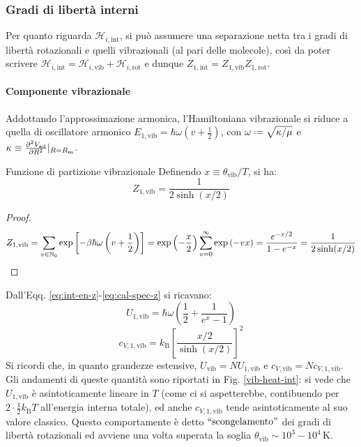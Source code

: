\subsubsection{Gradi di libertà interni}

Per quanto riguarda $ \mathcal{H}_{i,\text{int}} $, si può assumere una separazione netta tra i gradi di libertà rotazionali e quelli vibrazionali (al pari delle molecole), così da poter scrivere $ \mathcal{H}_{i,\text{int}} = \mathcal{H}_{i,\text{vib}} + \mathcal{H}_{i,\text{rot}} $ e dunque $ Z_{1,\text{int}} = Z_{1,\text{vib}} Z_{1,\text{rot}} $.

\paragraph{Componente vibrazionale}

Addottando l'approssimazione armonica, l'Hamiltoniana vibrazionale si riduce a quella di oscillatore armonico $ E_{1,\text{vib}} = \hbar \omega \left( v + \frac{1}{2} \right) $, con $ \omega \defeq\sqrt{\kappa / \mu} $ e $ \kappa \equiv \frac{\partial^2 V_\text{ad}}{\partial R^2}\vert_{R = R_\text{m}} $.

\begin{proposition}{Funzione di partizione vibrazionale}{}
	Definendo $ x \equiv \theta_\text{vib} / T $, si ha:
	\begin{equation}
		Z_{1,\text{vib}} = \frac{1}{2 \sinh(x/2)}
	\end{equation}

	\tcblower

	\begin{proof}
		\begin{equation*}
			Z_{1,\text{vib}} = \sum_{v \in \mathbb{N}_0} \exp \left[ -\beta \hbar \omega \left( v + \frac{1}{2} \right) \right] = \exp \left( - \frac{x}{2} \right) \sum_{v = 0}^\infty \exp \left( -v x \right) = \frac{e^{-x/2}}{1 - e^{-x}} = \frac{1}{2 \sinh(x/2)}
		\end{equation*}
	\end{proof}
\end{proposition}

Dall'Eqq. \ref{eq:int-en-z}-\ref{eq:cal-spec-z} si ricavano:
\begin{equation}
	U_{1,\text{vib}} = \hbar \omega \left( \frac{1}{2} + \frac{1}{e^x - 1} \right)
\end{equation}
\begin{equation}
	c_{V,1,\text{vib}} = k_\text{B} \left[ \frac{x/2}{\sinh(x/2)} \right]^2
\end{equation}
Si ricordi che, in quanto grandezze estensive, $ U_\text{vib} = N U_{1,\text{vib}} $ e $ c_{V,\text{vib}} = N c_{V,1,\text{vib}} $. Gli andamenti di queste quantità sono riportati in Fig. \ref{vib-heat-int}: si vede che $ U_{1,\text{vib}} $ è asintoticamente lineare in $ T $ (come ci si aspetterebbe, contibuendo per $ 2 \cdot \frac{1}{2} k_\text{B} T $ all'energia interna totale), ed anche $ c_{V,1,\text{vib}} $ tende asintoticamente al suo valore classico. Questo comportamente è detto $ ``\text{scongelamento}" $ dei gradi di libertà rotazionali ed avviene una volta superata la soglia $ \theta_\text{vib} \sim 10^3-10^4 \,\text{K} $.

